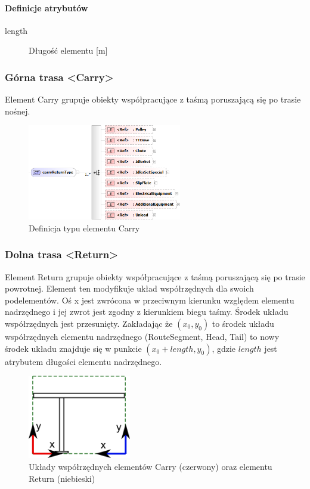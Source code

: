 \documentclass[12pt,a4paper]{article}
\begin{document}
\paragraph{Definicje atrybutów}
\begin{description}
\item[length] Długość elementu [m]
\end{description}


\subsubsection{Górna trasa <Carry>}
Element Carry grupuje obiekty współpracujące z taśmą poruszającą się po trasie
nośnej.

\begin{figure}[H]
  \centering
  \includegraphics[width=0.6\textwidth]{png/liquid/carryReturnType}
  \caption{Definicja typu elementu Carry}
  \label{fig:carryReturnType-xsd}
\end{figure}

\subsubsection{Dolna trasa <Return>}
Element Return grupuje obiekty współpracujące z taśmą poruszającą się po trasie
powrotnej.  Element ten modyfikuje układ współrzędnych dla swoich podelementów.
Oś x jest zwrócona w przeciwnym kierunku względem elementu nadrzędnego i jej
zwrot jest zgodny z kierunkiem biegu taśmy.  Środek układu współrzędnych jest
przesunięty.  Zakładając że $(x_0, y_0)$ to środek układu współrzędnych elementu
nadrzędnego (RouteSegment, Head, Tail) to nowy środek układu znajduje się w
punkcie $(x_0 + {length}, y_0)$, gdzie ${length}$ jest atrybutem długości
elementu nadrzędnego.

\begin{figure}[H]
  \centering
  \includegraphics[width=0.4\textwidth]{png/carryReturn_drw}
  \caption{Układy współrzędnych elementów Carry (czerwony) oraz
elementu Return (niebieski)}
  \label{fig:carryReturn-drw}
\end{figure}
\end{document}
